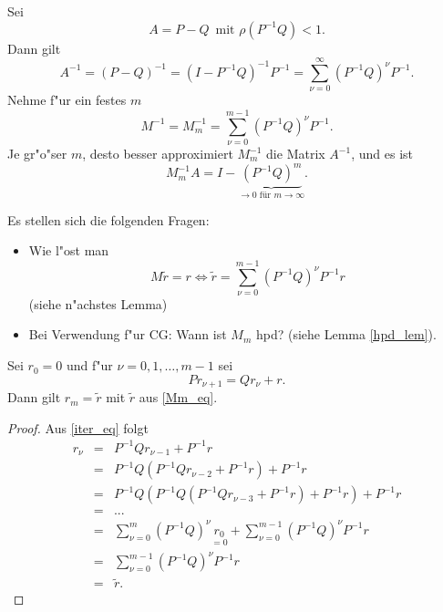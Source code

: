 \begin{bsp}
Sei
\[
A = P - Q \enspace \mbox{mit } \rho(P^{-1}Q) < 1.
\]
Dann gilt
\[
A^{-1} = (P-Q)^{-1} = (I - P^{-1}Q)^{-1}P^{-1} = \sum_{\nu=0}^\infty (P^{-1}Q)^\nu P^{-1}.
\]
Nehme f"ur ein festes $m$\label{S464}
\begin{equation} \label{Mm_def}
M^{-1} = M_m^{-1} = \sum_{\nu=0}^{m-1} (P^{-1}Q)^\nu P^{-1}.
\end{equation}
Je gr"o"ser $m$, desto besser approximiert $M_m^{-1}$ die Matrix $A^{-1}$, und es ist
\[
M_m^{-1} A = I - \underbrace{(P^{-1}Q)^{m}}_{\to 0 \text{ f\"ur } m \to \infty}.
\]
\end{bsp}
Es stellen sich die folgenden Fragen:

\begin{itemize}
\item Wie l"ost man
     \begin{equation} \label{Mm_eq}
      M\tilde{r} = r \Leftrightarrow \tilde{r} = \sum_{\nu=0}^{m-1} (P^{-1}Q)^\nu P^{-1}r
     \end{equation}
     (siehe n"achstes Lemma)
\item Bei Verwendung f"ur CG: Wann ist $M_m$ hpd? (siehe Lemma \ref{hpd_lem}).
\end{itemize}

\begin{lem}\label{S465} Sei $r_0 = 0$ und f"ur $\nu = 0,1,\ldots,m-1$ sei
\begin{equation} \label{iter_eq}
Pr_{\nu+1} = Qr_\nu + r.
\end{equation}
Dann gilt $r_m = \tilde{r}$ mit $\tilde{r}$ aus \eqref{Mm_eq}.
\end{lem}
\begin{proof}
Aus \eqref{iter_eq} folgt
\begin{eqnarray*}
r_\nu&=&P^{-1}Qr_{\nu-1}+P^{-1}r\\
&=&P^{-1}Q(P^{-1}Qr_{\nu-2}+P^{-1}r)+P^{-1}r\\
&=&P^{-1}Q(P^{-1}Q(P^{-1}Qr_{\nu-3}+P^{-1}r)+P^{-1}r)+P^{-1}r\\
&=&...\\
&=&\sum\limits_{\nu=0}^{m}(P^{-1}Q)^\nu \underset{=0}{r_0}+\sum\limits_{\nu=0}^{m-1}(P^{-1}Q)^\nu P^{-1}r\\
&=&\sum\limits_{\nu=0}^{m-1}(P^{-1}Q)^\nu P^{-1}r\\
&=&\tilde{r}.
\end{eqnarray*}
\end{proof}

